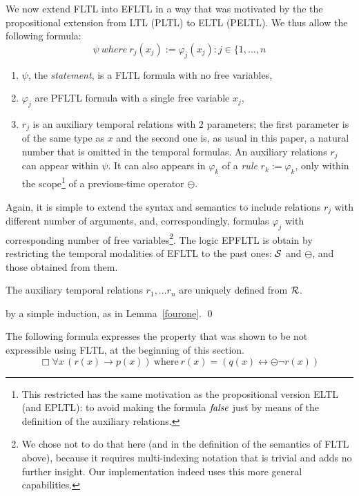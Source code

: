 We now extend FLTL into EFLTL in a way that was motivated by the the propositional extension from LTL (PLTL) to ELTL (PELTL). We thus allow the following formula:
\begin{equation}
\label{EFLTL}
\psi \mathit{\ where\ } r_j  ( x_j ) := 
\varphi_j (x_j) : j \in \{ 1 , \ldots , n \end{equation}
\begin{enumerate}
\item $\psi$, the {\em statement}, is a FLTL formula with
no free variables, 
\item $\varphi_j$ are PFLTL formula with a single
free variable $x_j$,
\item $r_j$ is an auxiliary temporal relations with $2$ parameters; the first parameter is of the same 
type as $x$ and the second one is, as usual in this paper,
a natural number that is omitted in the temporal formulas. 
An auxiliary relations $r_j$ can appear within $\psi$. It can also appears in $\varphi_k$ of a {\em rule} $r_k := \varphi_k$, only within the
scope\footnote{This restricted has the same motivation as
the propositional version ELTL (and EPLTL): to avoid making the
formula $\mathit{false}$ just by means of the definition of the auxiliary relations.}
of a previous-time operator $\ominus$. 
\end{enumerate}

Again, it
is simple to extend the syntax and semantics to include
relations $r_j$ with different number of arguments, and, correspondingly, formulas $\varphi_j$ with corresponding number of free
variables\footnote{We chose not to do that here (and in the definition of the semantics of FLTL above), because it
requires multi-indexing notation that is trivial and adds no further insight. Our implementation indeed uses
this more general capabilities.}.
The logic EPFLTL is obtain by restricting the temporal modalities of EFLTL to the past ones:
${\cal S}$ and $\ominus$, and those obtained from them.

\begin{lemma} \label{samesame}
The auxiliary temporal relations $r_1, \ldots r_n$ are
uniquely defined from ${\cal R}$.
\end{lemma}
 by a simple induction, as in Lemma~\ref{fourone}. \qed

The following formula expresses the property that was shown to be 
not expressible using FLTL, at the beginning of this section.
\begin{equation}
\Box \forall x \, (r(x)\rightarrow p(x)) \mathrm{\ where\ }
r(x) = ( q(x) \leftrightarrow \ominus \neg  r(x)) 
\label{eq:wolper-first-order}
\end{equation}

